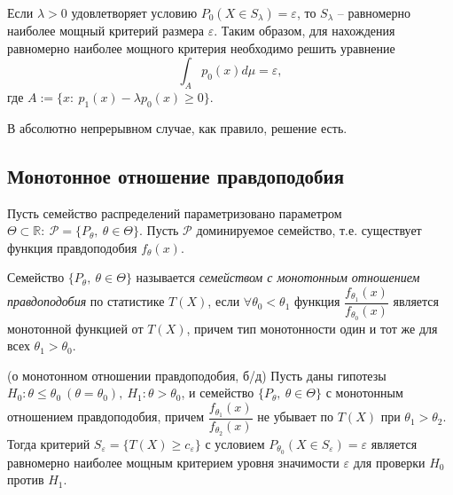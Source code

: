 \begin{corollary}
    Если $\displaystyle \lambda  >0$ удовлетворяет условию $\displaystyle P_{0}( X\in S_{\lambda }) =\varepsilon $, то $\displaystyle S_{\lambda }$ -- равномерно наиболее мощный критерий размера $\displaystyle \varepsilon $. Таким образом, для нахождения равномерно наиболее мощного критерия необходимо решить уравнение
    \begin{equation*}
        \int _{A} p_{0}( x) d\mu =\varepsilon ,
    \end{equation*}
    где $\displaystyle A:=\{x:\ p_{1}( x) -\lambda p_{0}( x) \geqslant 0\}$.
\end{corollary}
\begin{note}
    В абсолютно непрерывном случае, как правило, решение есть.
\end{note}
\subsection{Монотонное отношение правдоподобия}

Пусть семейство распределений параметризовано параметром $\displaystyle \Theta \subset \mathbb{R} :\ \mathcal{P} =\{P_{\theta } ,\ \theta \in \Theta \}$. Пусть $\displaystyle \mathcal{P}$ доминируемое семейство, т.е. существует функция правдоподобия $\displaystyle f_{\theta }( x)$.
\begin{definition}
    Семейство $\displaystyle \{P_{\theta } ,\ \theta \in \Theta \}$ называется \textit{семейством с монотонным отношением правдоподобия} по статистике $\displaystyle T( X)$, если $\displaystyle \forall \theta _{0} < \theta _{1}$ функция $\displaystyle \dfrac{f_{\theta _{1}}( x)}{f_{\theta _{0}}( x)}$ является монотонной функцией от $\displaystyle T( X)$, причем тип монотонности один и тот же для всех $\displaystyle \theta _{1}  >\theta _{0}$.
\end{definition}
\begin{theorem}
    (о монотонном отношении правдоподобия, б/д) Пусть даны гипотезы $\displaystyle H_{0} :\theta \leqslant \theta _{0} \ ( \theta =\theta _{0}) ,\ H_{1} :\theta  >\theta _{0}$, и семейство $\displaystyle \{P_{\theta } ,\ \theta \in \Theta \}$ с монотонным отношением правдоподобия, причем $\displaystyle \dfrac{f_{\theta _{1}}( x)}{f_{\theta _{2}}( x)}$ не убывает по $\displaystyle T( X)$ при $\displaystyle \theta _{1}  >\theta _{2}$. Тогда критерий $\displaystyle S_{\varepsilon } =\{T( X) \geqslant c_{\varepsilon }\}$ с условием $\displaystyle P_{\theta _{0}}( X\in S_{\varepsilon }) =\varepsilon $ является равномерно наиболее мощным критерием уровня значимости $\displaystyle \varepsilon $ для проверки $\displaystyle H_{0}$ против $\displaystyle H_{1}$.
\end{theorem}
